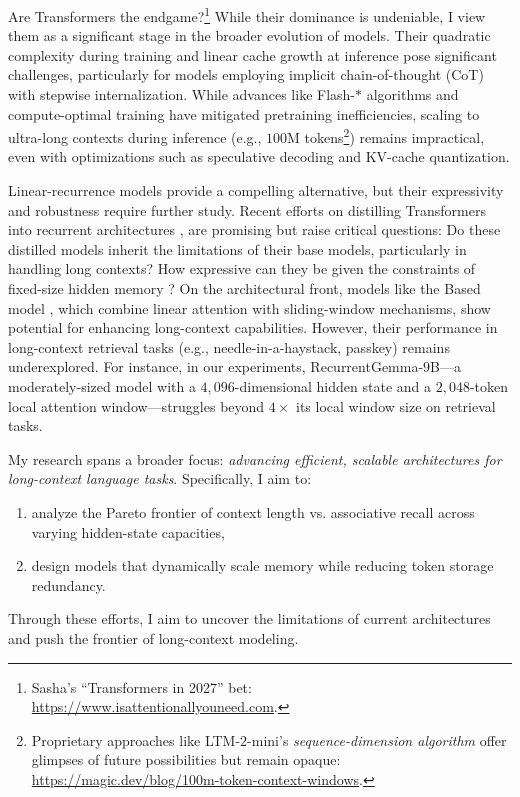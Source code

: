 Are Transformers the endgame?\footnote{Sasha's ``Transformers in 2027'' bet: \url{https://www.isattentionallyouneed.com}.}
%
While their dominance is undeniable, I view them as a significant stage in the broader evolution of models.
% 
Their quadratic complexity during training and linear cache growth at inference pose significant challenges, particularly for models employing implicit chain-of-thought (CoT) with stepwise internalization.
% 
While advances like Flash-$\ast$ algorithms \citep{fu_flashfftconv_2023,shah_flashattention-3_2024} and compute-optimal training \citep{muennighoff_scaling_2023} have mitigated pretraining inefficiencies, scaling to ultra-long contexts during inference (e.g., $100$M tokens\footnote{Proprietary approaches like LTM-$2$-mini's \textit{sequence-dimension algorithm} offer glimpses of future possibilities but remain opaque: \url{https://magic.dev/blog/100m-token-context-windows}.}) remains impractical, even with optimizations such as speculative decoding and KV-cache quantization.

Linear-recurrence models provide a compelling alternative, but their expressivity and robustness require further study.
% 
Recent efforts on distilling Transformers into recurrent architectures \citep{zhang_hedgehog_2024,wang_mamba_2024,zhang_lolcats_2024,bick_transformers_2024}, are promising but raise critical questions:
%
Do these distilled models inherit the limitations of their base models, particularly in handling long contexts?
% 
How expressive can they be given the constraints of fixed-size hidden memory \citep{jelassi_repeat_2024}?
% 
On the architectural front, models like the Based model \citep{arora_simple_2024}, which combine linear attention with sliding-window mechanisms, show potential for enhancing long-context capabilities.
% 
However, their performance in long-context retrieval tasks (e.g., needle-in-a-haystack, passkey) remains underexplored.
% 
For instance, in our experiments, RecurrentGemma-$9$B---a moderately-sized model with a $4,096$-dimensional hidden state and a $2,048$-token local attention window---struggles beyond $4\times$ its local window size on retrieval tasks.

My research spans a broader focus: \textit{advancing efficient, scalable architectures for long-context language tasks}.
% 
Specifically, I aim to:
\begin{enumerate}[itemsep=-2pt, topsep=-1pt] 
    \item analyze the Pareto frontier of context length vs. associative recall across varying hidden-state capacities,
    \item design models that dynamically scale memory while reducing token storage redundancy.
\end{enumerate}

Through these efforts, I aim to uncover the limitations of current architectures and push the frontier of long-context modeling.
